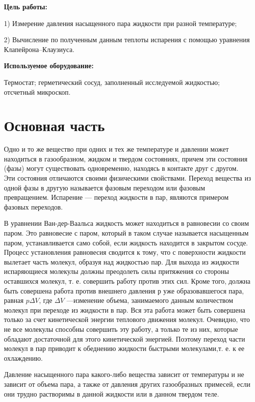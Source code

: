 \documentclass[a4paper,10pt]{article} %
\begin{document}
\textbf{Цель работы:}

1) Измерение давления насыщенного пара жидкости при разной температуре; 

2) Вычисление по полученным данным
теплоты испарения с помощью уравнения Клапейрона–Клаузиуса.

\textbf{Используемое оборудование:}

Термостат; герметический сосуд, заполненный исследуемой жидкостью; отсчетный микроскоп.

\section{Основная часть}

Одно и то же вещество при одних и тех же температуре и давлении может находиться в газообразном, жидком и твердом состояниях, причем эти состояния (фазы) могут существовать одновременно, находясь в контакте друг с другом.
 Эти состояния отличаются своими физическими свойствами. Переход вещества из одной фазы в другую называется фазовым переходом или фазовым превращением. Испарение — переход жидкости в пар, являются примером фазовых переходов. 

В уравнении Ван-дер-Ваальса жидкость может находиться в равновесии со своим паром. Это равновесие с паром, который в таком случае называется насыщенным паром, устанавливается само собой, если жидкость находится в закрытом сосуде.
Процесс установления равновесия сводится к тому, что с поверхности жидкости вылетает часть молекул, образуя над жидкостью пар. Для выхода из жидкости испаряющиеся молекулы должны преодолеть силы притяжения со стороны оставшихся молекул, т. е. совершить работу против этих сил. Кроме того, должна быть совершена работа против внешнего давления р уже
образовавшегося пара, равная $p\Delta V$, где $\Delta V$ —изменение объема,
занимаемого данным количеством молекул при переходе из жидкости в пар. Вся эта работа может быть совершена только за счет кинетической энергии теплового движения молекул. Очевидно, что не все молекулы способны совершить эту работу, а только те из них, которые обладают достаточной для этого кинетической энергией. Поэтому переход части молекул в пар приводит к обеднению жидкости быстрыми молекулами,т. е. к ее охлаждению.

Давление насыщенного пара какого-либо вещества зависит от температуры и не зависит от объема пара, а также от давления других газообразных примесей, если они трудно растворимы в данной жидкости или в данном твердом теле.
\end{document}
